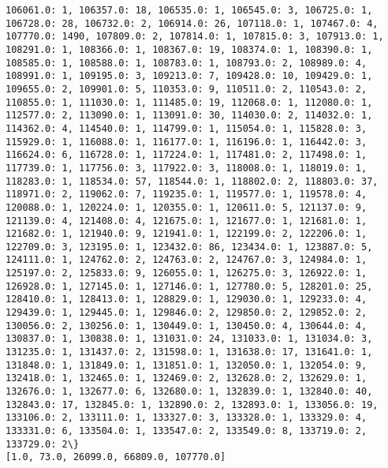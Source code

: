 \documentclass[11pt]{article}
\begin{document}
\begin{Verbatim}[commandchars=\\\{\}]
106061.0: 1, 106357.0: 18, 106535.0: 1, 106545.0: 3, 106725.0: 1, 106728.0: 28, 106732.0: 2, 106914.0: 26, 107118.0: 1, 107467.0: 4, 107770.0: 1490, 107809.0: 2, 107814.0: 1, 107815.0: 3, 107913.0: 1, 108291.0: 1, 108366.0: 1, 108367.0: 19, 108374.0: 1, 108390.0: 1, 108585.0: 1, 108588.0: 1, 108783.0: 1, 108793.0: 2, 108989.0: 4, 108991.0: 1, 109195.0: 3, 109213.0: 7, 109428.0: 10, 109429.0: 1, 109655.0: 2, 109901.0: 5, 110353.0: 9, 110511.0: 2, 110543.0: 2, 110855.0: 1, 111030.0: 1, 111485.0: 19, 112068.0: 1, 112080.0: 1, 112577.0: 2, 113090.0: 1, 113091.0: 30, 114030.0: 2, 114032.0: 1, 114362.0: 4, 114540.0: 1, 114799.0: 1, 115054.0: 1, 115828.0: 3, 115929.0: 1, 116088.0: 1, 116177.0: 1, 116196.0: 1, 116442.0: 3, 116624.0: 6, 116728.0: 1, 117224.0: 1, 117481.0: 2, 117498.0: 1, 117739.0: 1, 117756.0: 3, 117922.0: 3, 118008.0: 1, 118019.0: 1, 118283.0: 1, 118534.0: 57, 118544.0: 1, 118802.0: 2, 118803.0: 37, 118971.0: 2, 119062.0: 7, 119235.0: 1, 119577.0: 1, 119578.0: 4, 120088.0: 1, 120224.0: 1, 120355.0: 1, 120611.0: 5, 121137.0: 9, 121139.0: 4, 121408.0: 4, 121675.0: 1, 121677.0: 1, 121681.0: 1, 121682.0: 1, 121940.0: 9, 121941.0: 1, 122199.0: 2, 122206.0: 1, 122709.0: 3, 123195.0: 1, 123432.0: 86, 123434.0: 1, 123887.0: 5, 124111.0: 1, 124762.0: 2, 124763.0: 2, 124767.0: 3, 124984.0: 1, 125197.0: 2, 125833.0: 9, 126055.0: 1, 126275.0: 3, 126922.0: 1, 126928.0: 1, 127145.0: 1, 127146.0: 1, 127780.0: 5, 128201.0: 25, 128410.0: 1, 128413.0: 1, 128829.0: 1, 129030.0: 1, 129233.0: 4, 129439.0: 1, 129445.0: 1, 129846.0: 2, 129850.0: 2, 129852.0: 2, 130056.0: 2, 130256.0: 1, 130449.0: 1, 130450.0: 4, 130644.0: 4, 130837.0: 1, 130838.0: 1, 131031.0: 24, 131033.0: 1, 131034.0: 3, 131235.0: 1, 131437.0: 2, 131598.0: 1, 131638.0: 17, 131641.0: 1, 131848.0: 1, 131849.0: 1, 131851.0: 1, 132050.0: 1, 132054.0: 9, 132418.0: 1, 132465.0: 1, 132469.0: 2, 132628.0: 2, 132629.0: 1, 132676.0: 1, 132677.0: 6, 132680.0: 1, 132839.0: 1, 132840.0: 40, 132843.0: 17, 132845.0: 1, 132890.0: 2, 132893.0: 1, 133056.0: 19, 133106.0: 2, 133111.0: 1, 133327.0: 3, 133328.0: 1, 133329.0: 4, 133331.0: 6, 133504.0: 1, 133547.0: 2, 133549.0: 8, 133719.0: 2, 133729.0: 2\}
[1.0, 73.0, 26099.0, 66809.0, 107770.0]

    \end{Verbatim}
\end{document}
